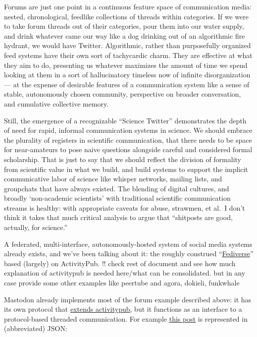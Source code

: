 \documentclass[notoc]{tufte-book}
\begin{document}
Forums are just one point in a continuous feature space of communication
media: nested, chronological, feedlike collections of threads within
categories. If we were to take forum threads out of their categories,
pour them into our water supply, and drink whatever came our way like a
dog drinking out of an algorithmic fire hydrant, we would have Twitter.
Algorithmic, rather than purposefully organized feed systems have their
own sort of tachycardic charm. They are effective at what they aim to
do, presenting us whatever maximizes the amount of time we spend looking
at them in a sort of hallucinatory timeless now of infinite
disorganization --- at the expense of desirable features of a
communication system like a sense of stable, autonomously chosen
community, perspective on broader conversation, and cumulative
collective memory.

Still, the emergence of a recognizable ``Science Twitter'' demonstrates
the depth of need for rapid, informal communication systems in science.
We should embrace the plurality of registers in scientific
communication, that there needs to be space for near-amateurs to pose
naive questions alongside careful and considered formal scholarship.
That is just to say that we should reflect the division of formality
from scientific value in what we build, and build systems to support the
implicit communicative labor of science like whisper networks, mailing
lists, and groupchats that have always existed. The blending of digital
cultures, and broadly `non-academic scientists' with traditional
scientific communication streams is healthy: with appropriate caveats
for abuse, strawmen, et al.~I don't think it takes that much critical
analysis to argue that ``shitposts are good, actually, for science.''

A federated, multi-interface, autonomously-hosted system of social media
systems already exists, and we've been talking about it: the roughly
construed ``\href{https://fediverse.party/}{Fediverse}'' based (largely)
on ActivityPub. {!! check rest of document and see how much explanation
of activitypub is needed here/what can be consolidated. but in any case
provide some other examples like peertube and agora, dokieli, funkwhale}

Mastodon already implements most of the forum example described above:
it has its own protocol that
\href{https://docs.joinmastodon.org/spec/activitypub/}{extends
activitypub}, but it functions as an interface to a protocol-based
threaded communication. For example
\href{https://social.coop/@jonny/107328829457619549}{this post} is
represented in (abbreviated) JSON:
\end{document}
